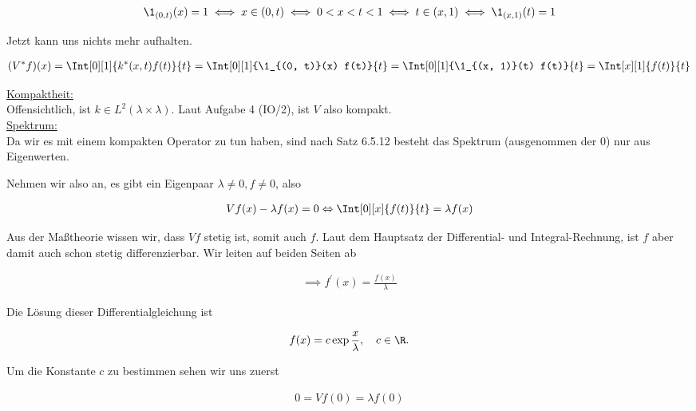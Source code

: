 \begin{solution}
\begin{align*}
  \1_{(0, t)}(x) = 1
  \iff
  x \in (0, t)
  \iff
  0 < x < t < 1
  \iff
  t \in (x, 1)
  \iff
  \1_{(x, 1)}(t) = 1
\end{align*}

Jetzt kann uns nichts mehr aufhalten.

\begin{align*}
  (V^\ast f)(x)
  =
  \Int[0][1]{k^\ast(x, t) f(t)}{t}
  =
  \Int[0][1]{\1_{(0, t)}(x) f(t)}{t}
  =
  \Int[0][1]{\1_{(x, 1)}(t) f(t)}{t}
  =
  \Int[x][1]{f(t)}{t}
\end{align*}

\underline{Kompaktheit:} \\

Offensichtlich, ist $k \in L^2(\lambda \times \lambda)$.
Laut Aufgabe 4 (IO/2), ist $V$ also kompakt. \\

\underline{Spektrum:} \\

Da wir es mit einem kompakten Operator zu tun haben, sind nach Satz 6.5.12 besteht
das Spektrum (ausgenommen der $0$) nur aus Eigenwerten.

Nehmen wir also an, es gibt ein Eigenpaar $\lambda \neq 0, f \neq 0$, also

\begin{align*}
  Vf(x) - \lambda f(x) = 0
  \Leftrightarrow
  \Int[0][x]{f(t)}{t} = \lambda f(x)
\end{align*}

Aus der Maßtheorie wissen wir, dass $V f$ stetig ist, somit auch $f$.
Laut dem Hauptsatz der Differential- und Integral-Rechnung, ist $f$ aber damit auch schon stetig differenzierbar.
Wir leiten auf beiden Seiten ab

\begin{align*}
  \implies
  f^\prime (x)
  =
  \frac{f(x)}{\lambda}
\end{align*}

Die Lösung dieser Differentialgleichung ist

\begin{align*}
  f(x)
  =
  c \exp{\frac{x}{\lambda}},
  \quad
  c \in \R.
\end{align*}

Um die Konstante $c$ zu bestimmen sehen wir uns zuerst

\begin{align*}
  0 = Vf(0) = \lambda f(0)
\end{align*}


\end{solution}
